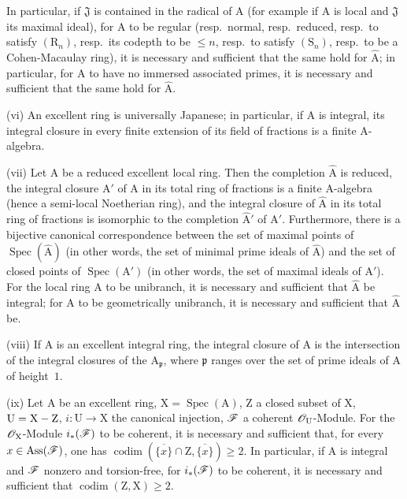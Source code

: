 \begin{scholium}[7.8.3]
In particular, if $\mathfrak{J}$ is contained in the radical of $\mathrm{A}$ \textup{(for example if $\mathrm{A}$ is local and $\mathfrak{J}$ its maximal ideal)}, for $\mathrm{A}$ to be regular \textup{(resp.}\ normal, \textup{resp.}\ reduced, \textup{resp.}\ to satisfy $(\mathrm{R}_n)$, \textup{resp.}\ its codepth to be $\leqslant n$, \textup{resp.}\ to satisfy $(\mathrm{S}_n)$, \textup{resp.}\ to be a Cohen-Macaulay ring), it is necessary and sufficient that the same hold for $\widehat{\mathrm{A}}$; in particular, for $\mathrm{A}$ to have no immersed associated primes, it is necessary and sufficient that the same hold for $\widehat{\mathrm{A}}$.

\textup{(vi)} An excellent ring is universally Japanese; in particular, if $\mathrm{A}$ is integral, its integral closure in every finite extension of its field of fractions is a finite $\mathrm{A}$-algebra.

\textup{(vii)} Let $\mathrm{A}$ be a reduced excellent \textup{local} ring. Then the completion $\widehat{\mathrm{A}}$ is reduced, the integral closure $\mathrm{A}'$ of $\mathrm{A}$ in its total ring of fractions is a finite $\mathrm{A}$-algebra \textup{(hence a} semi-local Noetherian \textup{ring}), and the integral closure of $\widehat{\mathrm{A}}$ in its total ring of fractions is isomorphic to the completion $\widehat{\mathrm{A}}'$ of $\mathrm{A}'$. Furthermore, there is a bijective canonical correspondence between the set of maximal points of $\operatorname{Spec}(\widehat{\mathrm{A}})$ \textup{(in other words, the set of} minimal \textup{prime ideals of $\widehat{\mathrm{A}}$)} and the set of closed points of $\operatorname{Spec}(\mathrm{A}')$ \textup{(in other words, the set of} maximal \textup{ideals of $\mathrm{A}'$)}. For the local ring $\mathrm{A}$ to be unibranch, it is necessary and sufficient that $\widehat{\mathrm{A}}$ be integral; for $\mathrm{A}$ to be geometrically unibranch, it is necessary and sufficient that $\widehat{\mathrm{A}}$ be.

\textup{(viii)} If $\mathrm{A}$ is an excellent integral ring, the integral closure of $\mathrm{A}$ is the intersection of the integral closures of the $\mathrm{A}_\mathfrak{p}$, where $\mathfrak{p}$ ranges over the set of prime ideals of $\mathrm{A}$ of height~$1$.

\textup{(ix)} Let $\mathrm{A}$ be an excellent ring, $\mathrm{X}=\operatorname{Spec}(\mathrm{A})$, $\mathrm{Z}$ a closed subset of $\mathrm{X}$, $\mathrm{U}=\mathrm{X}-\mathrm{Z}$, $i:\mathrm{U}\to\mathrm{X}$ the canonical injection, $\mathscr{F}$ a coherent $\mathscr{O}_\mathrm{U}$-Module. For the $\mathscr{O}_\mathrm{X}$-Module $i_*(\mathscr{F})$ to be coherent, it is necessary and sufficient that, for every $x\in\operatorname{Ass}(\mathscr{F})$, one has $\operatorname{codim}(\overline{\{x\}}\cap\mathrm{Z},\overline{\{x\}})\geqslant 2$. In particular, if $\mathrm{A}$ is integral and $\mathscr{F}$ nonzero and torsion-free, for $i_*(\mathscr{F})$ to be coherent, it is necessary and sufficient that $\operatorname{codim}(\mathrm{Z},\mathrm{X})\geqslant 2$.


\end{scholium}
